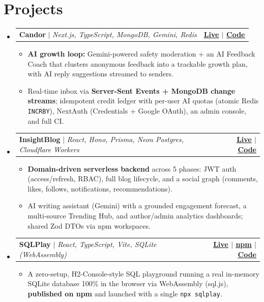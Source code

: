 \documentclass[letterpaper,11pt]{article}
\makeatletter
\newcommand{\resumeItem}[1]{
  \item\small{
    {#1 \vspace{-2pt}}
  }
}
\newcommand{\resumeProjectHeading}[2]{
    \item
    \begin{tabular*}{1.001\textwidth}{l@{\extracolsep{\fill}}r}
      \small#1 & \textbf{\small #2}\\
    \end{tabular*}\vspace{-7pt}
}
\newcommand{\resumeSubHeadingListStart}{\begin{itemize}[leftmargin=0.0in, label={}]}
\newcommand{\resumeSubHeadingListEnd}{\end{itemize}}
\newcommand{\resumeItemListStart}{\begin{itemize}}
\newcommand{\resumeItemListEnd}{\end{itemize}\vspace{-5pt}}
\makeatother
\begin{document}
\section{Projects}
    \vspace{-5pt}
    \resumeSubHeadingListStart
      \resumeProjectHeading
          {\textbf{Candor} $|$ \emph{Next.js, TypeScript, MongoDB, Gemini, Redis}}{\href{https://candor-cyan.vercel.app}{\underline{Live}} $|$ \href{https://github.com/Yogesh0627/anonymous-message-app}{\underline{Code}}}
          \resumeItemListStart
            \resumeItem{\textbf{AI growth loop:} Gemini-powered safety moderation + an AI Feedback Coach that clusters anonymous feedback into a trackable growth plan, with AI reply suggestions streamed to senders.}
            \resumeItem{Real-time inbox via \textbf{Server-Sent Events + MongoDB change streams}; idempotent credit ledger with per-user AI quotas (atomic Redis \texttt{INCRBY}), NextAuth (Credentials + Google OAuth), an admin console, and full CI.}
          \resumeItemListEnd
          \vspace{-13pt}
      \resumeProjectHeading
          {\textbf{InsightBlog} $|$ \emph{React, Hono, Prisma, Neon Postgres, Cloudflare Workers}}{\href{https://insightblog-one.vercel.app}{\underline{Live}} $|$ \href{https://github.com/Yogesh0627/Full_Stack_Project}{\underline{Code}}}
          \resumeItemListStart
            \resumeItem{\textbf{Domain-driven serverless backend} across 5 phases: JWT auth (access/refresh, RBAC), full blog lifecycle, and a social graph (comments, likes, follows, notifications, recommendations).}
            \resumeItem{AI writing assistant (Gemini) with a grounded engagement forecast, a multi-source Trending Hub, and author/admin analytics dashboards; shared Zod DTOs via npm workspaces.}
          \resumeItemListEnd
          \vspace{-13pt}
      \resumeProjectHeading
          {\textbf{SQLPlay} $|$ \emph{React, TypeScript, Vite, SQLite (WebAssembly)}}{\href{https://sqlplay.vercel.app}{\underline{Live}} $|$ \href{https://www.npmjs.com/package/sqlplay}{\underline{npm}} $|$ \href{https://github.com/Yogesh0627/sqlplay}{\underline{Code}}}
          \resumeItemListStart
            \resumeItem{A zero-setup, H2-Console-style SQL playground running a real in-memory SQLite database 100\% in the browser via WebAssembly (sql.js), \textbf{published on npm} and launched with a single \texttt{npx sqlplay}.}
          \resumeItemListEnd
    \resumeSubHeadingListEnd
\vspace{-9pt}
\end{document}
